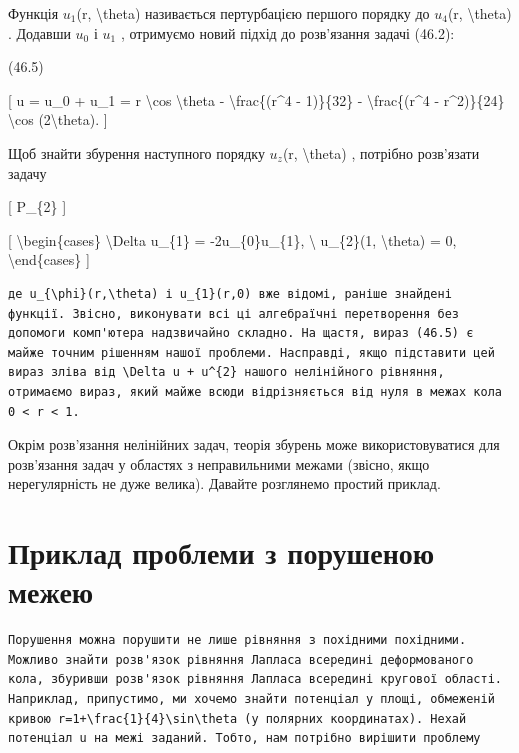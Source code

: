 \documentclass[
]{article}
\begin{document}
Функція \(u_1\)(r, \textbackslash theta) називається пертурбацією
першого порядку до \(u_4\)(r, \textbackslash theta) . Додавши \(u_0\) і
\(u_1\) , отримуємо новий підхід до розв'язання задачі (46.2):

(46.5)

{[} u = u\_0 + u\_1 = r \textbackslash cos \textbackslash theta -
\textbackslash frac\{(r\^{}4 - 1)\}\{32\} - \textbackslash frac\{(r\^{}4
- r\^{}2)\}\{24\} \textbackslash cos (2\textbackslash theta). {]}

Щоб знайти збурення наступного порядку \(u_{z}\)(r,
\textbackslash theta) , потрібно розв'язати задачу

{[} P\_\{2\} {]}

{[} \textbackslash begin\{cases\} \textbackslash Delta u\_\{1\} =
-2u\_\{0\}u\_\{1\}, \textbackslash{} u\_\{2\}(1, \textbackslash theta) =
0, \textbackslash end\{cases\} {]}

\begin{verbatim}
де u_{\phi}(r,\theta) і u_{1}(r,0) вже відомі, раніше знайдені функції. Звісно, виконувати всі ці алгебраїчні перетворення без допомоги комп'ютера надзвичайно складно. На щастя, вираз (46.5) є майже точним рішенням нашої проблеми. Насправді, якщо підставити цей вираз зліва від \Delta u + u^{2} нашого нелінійного рівняння, отримаємо вираз, який майже всюди відрізняється від нуля в межах кола 0 < r < 1.
\end{verbatim}

Окрім розв'язання нелінійних задач, теорія збурень може
використовуватися для розв'язання задач у областях з неправильними
межами (звісно, якщо нерегулярність не дуже велика). Давайте розглянемо
простий приклад.

\section{Приклад проблеми з порушеною
межею}\label{ux43fux440ux438ux43aux43bux430ux434-ux43fux440ux43eux431ux43bux435ux43cux438-ux437-ux43fux43eux440ux443ux448ux435ux43dux43eux44e-ux43cux435ux436ux435ux44e}

\begin{verbatim}
Порушення можна порушити не лише рівняння з похідними похідними. Можливо знайти розв'язок рівняння Лапласа всередині деформованого кола, збуривши розв'язок рівняння Лапласа всередині кругової області. Наприклад, припустимо, ми хочемо знайти потенціал у площі, обмеженій кривою r=1+\frac{1}{4}\sin\theta (у полярних координатах). Нехай потенціал u на межі заданий. Тобто, нам потрібно вирішити проблему
\end{verbatim}
\end{document}
